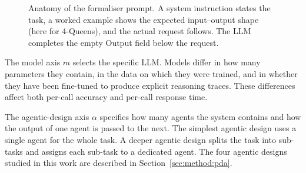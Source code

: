 \documentclass[11pt,a4paper]{article}
\begin{document}
\begin{figure}[H]
\centering
{}
\caption{Anatomy of the formaliser prompt. A system instruction states the task, a worked example shows the expected input--output shape (here for 4-Queens), and the actual request follows. The LLM completes the empty Output field below the request.}
\label{fig:prompt-anatomy}
\end{figure}

The model axis $m$ selects the specific LLM. Models differ in how many parameters they contain, in the data on which they were trained, and in whether they have been fine-tuned to produce explicit reasoning traces. These differences affect both per-call accuracy and per-call response time.

The agentic-design axis $\alpha$ specifies how many agents the system contains and how the output of one agent is passed to the next. The simplest agentic design uses a single agent for the whole task. A deeper agentic design splits the task into sub-tasks and assigns each sub-task to a dedicated agent. The four agentic designs studied in this work are described in Section~\ref{sec:method:pda}.
\end{document}
